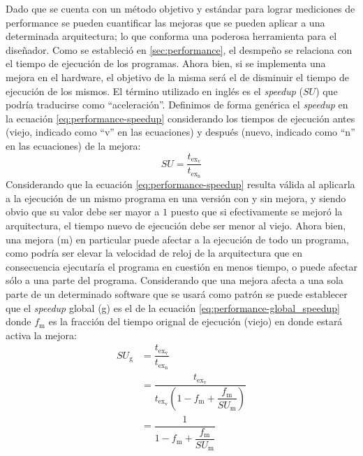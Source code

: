 Dado que se cuenta con un método objetivo y estándar para lograr mediciones de 
performance se pueden cuantificar las mejoras que se pueden aplicar a una 
determinada arquitectura; lo que conforma una poderosa herramienta para el 
diseñador. Como se estableció en \ref{sec:performance}, el desmpeño se 
relaciona con el tiempo de ejecución de los programas. Ahora bien, si se 
implementa una mejora en el hardware, el objetivo de la misma será el de 
disminuir el tiempo de ejecución de los mismos. El término utilizado en inglés 
es el \emph{speedup} ($SU$) que podría traducirse como ``aceleración''. 
Definimos de forma genérica el \emph{speedup} en la ecuación 
\ref{eq:performance-speedup} considerando los tiempos de ejecución antes 
(viejo, indicado como ``v'' en las ecuaciones) y después (nuevo, indicado como 
``n'' en las ecuaciones) de la mejora:
\begin{equation}
  \label{eq:performance-speedup}
  SU = \dfrac{t_{\text{ex}_{\text{v}}}}{t_{\text{ex}_\text{n}}}
\end{equation}
Considerando que la ecuación \ref{eq:performance-speedup} resulta válida al 
aplicarla a la ejecución de un mismo programa en una versión con y sin mejora, 
y siendo obvio que su valor debe ser mayor a $1$ puesto que si efectivamente 
se mejoró la arquitectura, el tiempo nuevo de ejecución debe ser menor al 
viejo. Ahora bien, una mejora (m) en particular puede afectar a la ejecución de 
todo un programa, como podría ser elevar la velocidad de reloj de la 
arquitectura que en consecuencia ejecutaría el programa en cuestión en menos 
tiempo, o puede afectar sólo a una parte del programa. Considerando que una 
mejora afecta a una sola parte de un determinado software que se usará como 
patrón se puede establecer que el \emph{speedup} global (g) es el de la 
ecuación \ref{eq:performance-global_speedup} donde $f_{\text{m}}$ es la 
fracción del tiempo orignal de ejecución (viejo) en donde estará activa la 
mejora:
\begin{equation}
  \label{eq:performance-global_speedup}
  \begin{split}
    SU_{\text{g}} & = 
\dfrac{ t_{\text{ex}_{\text{v}}} } { 
t_{\text{ex}_\text{n}} }\\
  & = \dfrac{ t_{\text{ex}_{\text{v}}} } { 
t_{\text{ex}_{\text{v}}} \left( 1 - f_{\text{m}} + 
\dfrac{ f_{\text{m}} } { SU_{\text{m}} } \right) }\\
  & = \dfrac{ 1 } { 1 - f_{\text{m}} + 
\dfrac{ f_{\text{m}} } { SU_{\text{m}} } }
  \end{split}
\end{equation}
